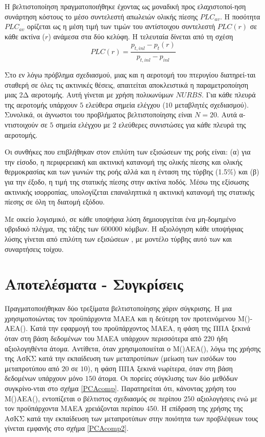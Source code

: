 Η βελτιστοποίηση πραγματοποιήθηκε έχοντας ως μοναδική προς ελαχιστοποί-ηση συνάρτηση κόστους το μέσο συντελεστή απωλειών ολικής πίεσης $PLC_{av}$.  Η ποσότητα $PLC_{av}$ ορίζεται ως η μέση τιμή των τιμών του αντίστοιχου συντελεστή $PLC(r)$ σε κάθε ακτίνα ($r$) ανάμεσα στα δύο κελύφη. Η τελευταία δίνεται από τη σχέση 
\begin{equation}
PLC(r)=\frac{p_{t,inl}-p_t(r)}{p_{t,inl}-p_{inl}}
\label{res:ntua_blade:plc}
\end{equation}

Στο εν λόγω πρόβλημα σχεδιασμού, μιας και η αεροτομή του πτερυγίου διατηρεί-ται σταθερή σε όλες τις ακτινικές θέσεις, απαιτείται αποκλειστικά η παραμετροποίηση μιας 2Δ αεροτομής. Αυτή γίνεται με χρήση πολυωνύμων $NURBS$. Για κάθε πλευρά της αεροτομής υπάρχουν $5$ ελεύθερα σημεία ελέγχου ($10$ μεταβλητές σχεδιασμού). 
Συνολικά, οι άγνωστοι του προβλήματος βελτιστοποίησης είναι $N=20$. 
Αυτά α-ντιστοιχούν σε $5$ σημεία ελέγχου με $2$ ελεύθερες συνιστώσες για κάθε πλευρά της
αεροτομής.

Οι συνθήκες που επιβλήθηκαν στον επιλύτη των εξισώσεων της ροής είναι: (α) για την είσοδο, η περιφερειακή και ακτινική κατανομή της ολικής πίεσης και ολικής θερμοκρασίας και των γωνιών της
ροής αλλά και η ένταση της τύρβης (1.5\%) και (β) για την έξοδο, η τιμή της στατικής πίεσης στην ακτίνα ποδός. Μέσω της εξίσωσης
ακτινικής ισορροπίας,  υπολογίζεται επαναληπτικά η ακτινική κατανομή της στατικής πίεσης σε όλη τη διατομή εξόδου.

Με οικείο λογισμικό, σε κάθε υποψήφια λύση δημιουργείται ένα μη-δομημένο υβριδικό πλέγμα, της τάξης των $600 000$ κόμβων. Η αξιολόγηση κάθε υποψήφιας λύσης γίνεται από επιλύτη των εξισώσεων , με μοντέλο τύρβης αυτό των    και συναρτήσεις τοίχου.  



\section{Αποτελέσματα - Συγκρίσεις } 
Πραγματοποιήθηκαν δύο τρεξίματα βελτιστοποίησης χάριν σύγκρισης. Η μια χρησιμοποιώντας τον προϋπάρχοντα ΜΑΕΑ και η δεύτερη τον προτεινόμενου Μ()-ΑΕΑ(). Κατά την εφαρμογή του προϋπάρχοντος ΜΑΕΑ, η φάση της ΠΠΑ ξεκινά όταν στη βάση δεδομένων του ΜΑΕΑ υπάρχουν περισσότερα από $220$ ήδη αξιολογηθέντα άτομα. Αντίθετα, όταν χρησιμοποιείται ο Μ()ΑΕΑ(), λόγω της χρήσης της ΑσΚΣ κατά την εκπαίδευση των μεταπροτύπων (μείωση των εισόδων του μεταπροτύπου από $20$ σε $10$), η φάση ΠΠΑ ξεκινά νωρίτερα, όταν στη βάση δεδομένων υπάρχουν μόνο $150$ άτομα. Οι πορείες σύγκλισης των δύο μεθόδων συγκρίνο-νται στο σχήμα \ref{PCAcomp}. Παρατηρείται ότι, κάνοντας χρήση του  Μ()ΑΕΑ(), εντοπίζεται ο βέλτιστος σχεδιασμός σε περίπου $250$ αξιολογήσεις ενώ με τον προϋπάρχοντα ΜΑΕΑ χρειάζονται περίπου $450$. Η επίδραση της χρήσης της ΑσΚΣ κατά την εκπαίδευση των μεταπροτύπων στην  ποιότητα των προβλέψεων τους γίνεται εμφανής στο σχήμα \ref{PCAcomp2}. 




